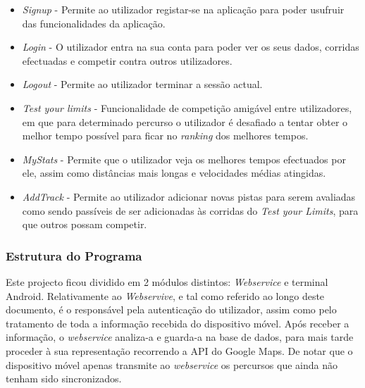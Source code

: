 \documentclass[15pt,a4paper]{article}
\begin{document}
\begin{itemize}

 \item \textit{Signup} - Permite ao utilizador registar-se na aplicação para poder usufruir das funcionalidades da aplicação.

 \item \textit{Login} - O utilizador entra na sua conta para poder ver os seus dados, corridas efectuadas e competir contra outros utilizadores.

 \item \textit{Logout} - Permite ao utilizador terminar a sessão actual.

 \item \textit{Test your limits} - Funcionalidade de competição amigável entre utilizadores, em que para determinado percurso o utilizador é desafiado a tentar obter o melhor tempo possível para ficar no  \textit{ranking} dos melhores tempos.

 \item \textit{MyStats} -  Permite que o utilizador veja os melhores tempos efectuados por ele, assim como distâncias mais longas e velocidades médias atingidas.

 \item \textit{AddTrack} -  Permite ao utilizador adicionar novas pistas para serem avaliadas como sendo passíveis de ser adicionadas às corridas do \textit{Test your Limits}, para que outros possam competir.

\end{itemize}


\subsubsection{Estrutura do Programa}

Este projecto ficou dividido em 2 módulos distintos: \textit{Webservice} e terminal Android. Relativamente ao \textit{Webservive}, e tal como referido ao longo deste documento, é o responsável pela autenticação do utilizador, assim como pelo tratamento de toda a informação recebida do dispositivo móvel. Após receber a informação, o \textit{webservice} analiza-a e guarda-a na base de dados, para mais tarde proceder à sua representação recorrendo a API do Google Maps. De notar que o dispositivo móvel apenas transmite ao \textit{webservice} os percursos que ainda não tenham sido sincronizados.
\end{document}
